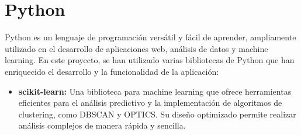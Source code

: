 \section{Python}
Python es un lenguaje de programación versátil y fácil de aprender, ampliamente utilizado en el desarrollo de aplicaciones web, análisis de datos y machine learning. En este proyecto, se han utilizado varias bibliotecas de Python que han enriquecido el desarrollo y la funcionalidad de la aplicación:

\begin{itemize}
    \item \textbf{scikit-learn:} Una biblioteca para machine learning que ofrece herramientas eficientes para el análisis predictivo y la implementación de algoritmos de clustering, como DBSCAN y OPTICS. Su diseño optimizado permite realizar análisis complejos de manera rápida y sencilla.
 

\end{itemize}
